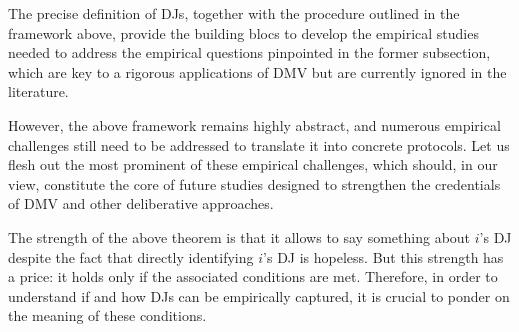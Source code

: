 \documentclass[version=3.21, pagesize, twoside=off, bibliography=totoc, DIV=calc, fontsize=12pt, a4paper, french, english]{scrartcl}
\begin{document}
The precise definition of \acp{DJ}, together with the procedure outlined in the framework above, provide the building blocs to develop the empirical studies needed to address the empirical questions pinpointed in the former subsection, which are key to a rigorous applications of \ac{DMV} but are currently ignored in the literature.


However, the above framework remains highly abstract, and numerous empirical challenges still need to be addressed to translate it into concrete protocols. Let us flesh out the most prominent of these empirical challenges, which should, in our view, constitute the core of future studies designed to strengthen the credentials of \ac{DMV} and other deliberative approaches. 

The strength of the above theorem is that it allows to say something about $i$’s \ac{DJ} despite the fact that directly identifying $i$’s \ac{DJ} is hopeless. 
But this strength has a price: it holds only if the associated conditions are met. 
Therefore, in order to understand if and how \acp{DJ} can be empirically captured, it is crucial to ponder on the meaning of these conditions.
\end{document}

